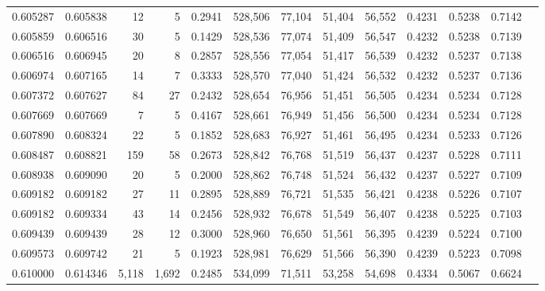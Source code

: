 \begin{tabular}{rrrrrrrrrrrrr}
0.605287 & 0.605838 &     12 &     5 &                                     0.2941 & 528,506 &  77,104 &  51,404 &  56,552 & 0.4231 & 0.5238 & 0.7142 \\
0.605859 & 0.606516 &     30 &     5 &                                     0.1429 & 528,536 &  77,074 &  51,409 &  56,547 & 0.4232 & 0.5238 & 0.7139 \\
0.606516 & 0.606945 &     20 &     8 &                                     0.2857 & 528,556 &  77,054 &  51,417 &  56,539 & 0.4232 & 0.5237 & 0.7138 \\
0.606974 & 0.607165 &     14 &     7 &                                     0.3333 & 528,570 &  77,040 &  51,424 &  56,532 & 0.4232 & 0.5237 & 0.7136 \\
0.607372 & 0.607627 &     84 &    27 &                                     0.2432 & 528,654 &  76,956 &  51,451 &  56,505 & 0.4234 & 0.5234 & 0.7128 \\
0.607669 & 0.607669 &      7 &     5 &                                     0.4167 & 528,661 &  76,949 &  51,456 &  56,500 & 0.4234 & 0.5234 & 0.7128 \\
0.607890 & 0.608324 &     22 &     5 &                                     0.1852 & 528,683 &  76,927 &  51,461 &  56,495 & 0.4234 & 0.5233 & 0.7126 \\
0.608487 & 0.608821 &    159 &    58 &                                     0.2673 & 528,842 &  76,768 &  51,519 &  56,437 & 0.4237 & 0.5228 & 0.7111 \\
0.608938 & 0.609090 &     20 &     5 &                                     0.2000 & 528,862 &  76,748 &  51,524 &  56,432 & 0.4237 & 0.5227 & 0.7109 \\
0.609182 & 0.609182 &     27 &    11 &                                     0.2895 & 528,889 &  76,721 &  51,535 &  56,421 & 0.4238 & 0.5226 & 0.7107 \\
0.609182 & 0.609334 &     43 &    14 &                                     0.2456 & 528,932 &  76,678 &  51,549 &  56,407 & 0.4238 & 0.5225 & 0.7103 \\
0.609439 & 0.609439 &     28 &    12 &                                     0.3000 & 528,960 &  76,650 &  51,561 &  56,395 & 0.4239 & 0.5224 & 0.7100 \\
0.609573 & 0.609742 &     21 &     5 &                                     0.1923 & 528,981 &  76,629 &  51,566 &  56,390 & 0.4239 & 0.5223 & 0.7098 \\
0.610000 & 0.614346 &  5,118 & 1,692 &                                     0.2485 & 534,099 &  71,511 &  53,258 &  54,698 & 0.4334 & 0.5067 & 0.6624 \\

\end{tabular}
